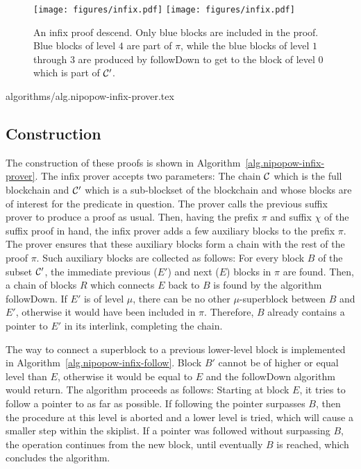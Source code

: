 \begin{figure}[h]
    \caption{An infix proof descend. Only blue blocks are included in the proof.
    Blue blocks of level $4$ are part of $\pi$, while the blue blocks of level
    $1$ through $3$ are produced by followDown to get to the block of level $0$
    which is part of $\mathcal{C}'$.}
    \centering
    \iftwocolumn
        \texttt{[image: figures/infix.pdf]}
    \else
        \texttt{[image: figures/infix.pdf]}
    \fi
    \label{fig.infix}
\end{figure}

{algorithms/alg.nipopow-infix-prover.tex}

\subsection{Construction}

The construction of these proofs is shown in
Algorithm~\ref{alg.nipopow-infix-prover}. The infix prover accepts two
parameters: The chain $\mathcal{C}$ which is the full blockchain and $\mathcal{C}'$ which
is a sub-blockset of the blockchain and whose blocks are of interest for the
predicate in question. The prover calls the previous suffix prover to produce a
proof as usual. Then, having the prefix $\pi$ and suffix $\chi$ of the suffix
proof in hand, the infix prover adds a few auxiliary blocks to the prefix $\pi$.
The prover ensures that these auxiliary blocks form a chain with the rest of the
proof $\pi$. Such auxiliary blocks are collected as follows: For every block $B$
of the subset $\mathcal{C}'$, the immediate previous ($E'$) and next ($E$) blocks
in $\pi$ are found. Then, a chain of blocks $R$ which connects $E$ back to $B$
is found by the algorithm \textsf{followDown}. If $E'$ is of level $\mu$, there
can be no other $\mu$-superblock between $B$ and $E'$, otherwise it would have
been included in $\pi$. Therefore, $B$ already contains a pointer to $E'$ in its
interlink, completing the chain.

The way to connect a superblock to a previous lower-level block is implemented
in Algorithm~\ref{alg.nipopow-infix-follow}.  Block $B'$ cannot be of higher or
equal level than $E$, otherwise it would be equal to $E$ and the
\textsf{followDown} algorithm would return. The algorithm proceeds as follows:
Starting at block $E$, it tries to follow a pointer to as far as possible. If
following the pointer surpasses $B$, then the procedure at this level is aborted
and a lower level is tried, which will cause a smaller step within the skiplist.
If a pointer was followed without surpassing $B$, the operation continues from
the new block, until eventually $B$ is reached, which concludes the algorithm.

